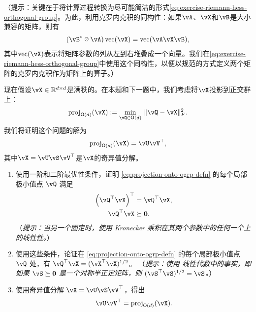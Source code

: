\documentclass[../../book-main.tex]{subfiles}
\begin{document}
（提示：关键在于将计算过程转换为尽可能简洁的形式\eqref{eq:exercise-riemann-hess-orthogonal-group}。为此，利用克罗内克积的同构性：如果$\vA$、$\vX$和$\vB$是大小兼容的矩阵，则有
        \begin{equation*}
            (\vB\adj \kron \vA) \Vec(\vX) = \Vec(\vA \vX \vB),
        \end{equation*}
        其中$\Vec(\vX)$表示将矩阵参数的列从左到右堆叠成一个向量。我们在\eqref{eq:exercise-riemann-hess-orthogonal-group}中使用这个同构性，以便以规范的方式定义两个矩阵的克罗内克积作为矩阵上的算子。）

        现在假设$\vX \in \R^{d\times d}$是满秩的。在本题和下一题中，我们考虑将$\vX$投影到正交群上：
        \begin{equation}\label{eq:projection-onto-ogrp-defn}
            \mathrm{proj}_{\O(d)}(\vX) :=
            \min_{\vQ \in \O(d)
            }\, \norm{\vQ - \vX}_F^2.
        \end{equation}
        我们将证明这个问题的解为
        \begin{equation*}
            \mathrm{proj}_{\O(d)}(\vX)
            =
            \vU \vV^\top,
        \end{equation*}
        其中$\vX = \vU \vS \vV^\top$是$\vX$的奇异值分解。

\begin{enumerate}
            \item 使用一阶和二阶最优性条件，证明 \eqref{eq:projection-onto-ogrp-defn} 的每个局部极小值点 $\vQ$ 满足
            \begin{align*}
                \left( \vQ^\top \vX \right)^\top &= \vQ^\top \vX, \\
                \vQ^\top \vX &\succeq \mathbf{0}.
            \end{align*}
            （\textit{提示：当另一个固定时，使用 Kronecker 乘积在其两个参数中的任何一个上的线性性。}）
            \item 使用这些条件，论证在 \eqref{eq:projection-onto-ogrp-defn} 的每个局部极小值点 $\vQ$ 处，有 $\vQ^\top \vX = (\vX^\top \vX)^{1/2}$。
            （\textit{提示：使用 %
            线性代数中的事实，即如果 $\vS \succeq \mathbf{0}$ 是一个对称半正定矩阵，则 $(\vS^\top\vS)^{1/2} = \vS$。}）
            \item 使用奇异值分解 $\vX = \vU \vS \vV^\top$，得出
            \begin{equation*}
                \vU \vV^\top
                =
                \mathrm{proj}_{\O(d)}(\vX).
            \end{equation*}
        \end{enumerate}
\end{document}
